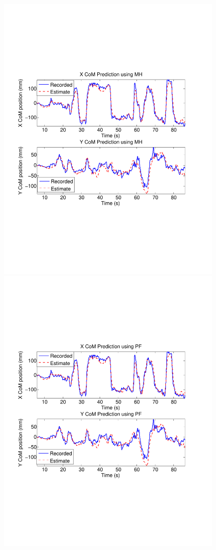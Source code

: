 \begin{figure}
\centering
\vskip -2cm
\includegraphics[trim=1cm 6cm 2cm 4cm, clip=true, width=\columnwidth]{figures/MH_Test2.pdf} 
\vskip -0.5cm
\includegraphics[trim=1cm 6cm 2cm 4cm, clip=true, width=\columnwidth]{figures/PF_Test2.pdf}

\end{figure}
